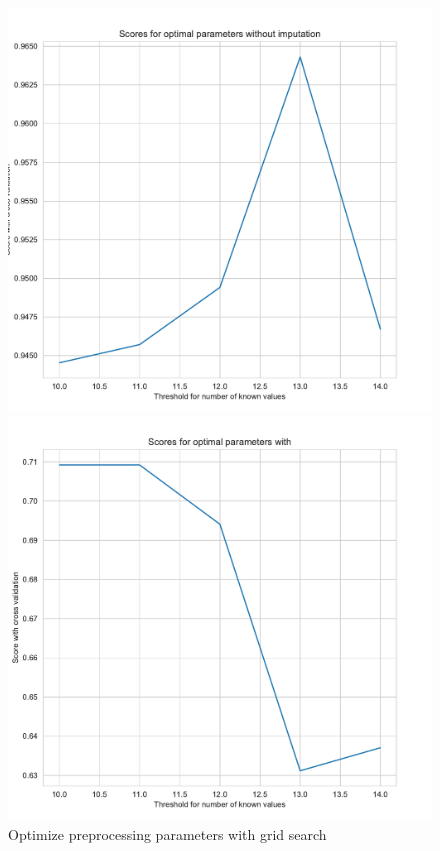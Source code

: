\documentclass[11pt]{article}
\begin{document}
\begin{figure}
\centering
\begin{minipage}[t]{0.3\textwidth}
\includegraphics[width=1\linewidth]{voting/threshold_grid_ppn0.pdf}
\end{minipage}
\begin{minipage}[t]{0.3\textwidth}
\includegraphics[width=1\linewidth]{voting/threshold_grid_ppn1.pdf}
\end{minipage}
   \caption{Optimize preprocessing parameters with grid search}
\label{votingfig_fig1}
\end{figure}
\end{document}
